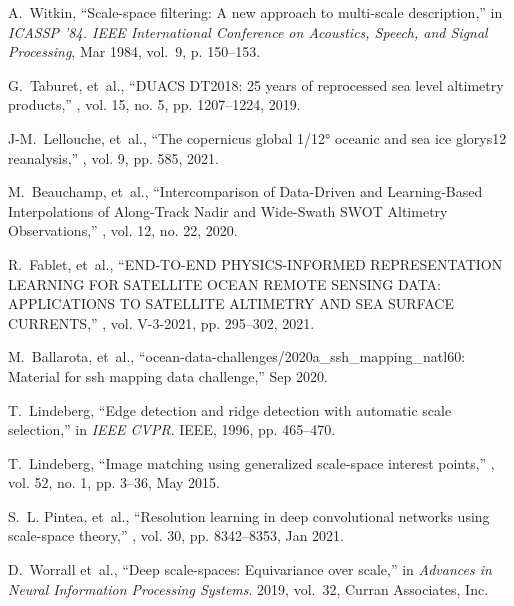 \begin{bibunit}
\begin{thebibliography}{10}
A.~Witkin,
\newblock ``Scale-space filtering: A new approach to multi-scale description,''
\newblock in {\em ICASSP ’84. IEEE International Conference on Acoustics,
  Speech, and Signal Processing}, Mar 1984, vol.~9, p. 150–153.

G.~Taburet, et~al.,
\newblock ``{DUACS} {DT2018}: 25 years of reprocessed sea level altimetry
  products,''
, vol. 15, no. 5, pp. 1207--1224, 2019.

J-M.~Lellouche, et~al.,
\newblock ``The copernicus global 1/12° oceanic and sea ice glorys12
  reanalysis,''
, vol. 9, pp. 585, 2021.

M.~Beauchamp, et~al.,
\newblock ``Intercomparison of {Data}-{Driven} and {Learning}-{Based}
  {Interpolations} of {Along}-{Track} {Nadir} and {Wide}-{Swath} {SWOT}
  {Altimetry} {Observations},''
, vol. 12, no. 22, 2020.

R.~Fablet, et~al.,
\newblock ``{END}-{TO}-{END} {PHYSICS}-{INFORMED} {REPRESENTATION} {LEARNING}
  {FOR} {SATELLITE} {OCEAN} {REMOTE} {SENSING} {DATA}: {APPLICATIONS} {TO}
  {SATELLITE} {ALTIMETRY} {AND} {SEA} {SURFACE} {CURRENTS},''
, vol. V-3-2021, pp. 295--302, 2021.

M.~Ballarota, et~al.,
\newblock ``ocean-data-challenges/2020a\_ssh\_mapping\_natl60: Material for ssh
  mapping data challenge,'' Sep 2020.

T.~Lindeberg,
\newblock ``Edge detection and ridge detection with automatic scale
  selection,''
\newblock in {\em IEEE CVPR}. IEEE, 1996, pp. 465--470.

T.~Lindeberg,
\newblock ``Image matching using generalized scale-space interest points,''
, vol. 52, no. 1, pp.
  3–36, May 2015.

S.~L. Pintea, et~al.,
\newblock ``Resolution learning in deep convolutional networks using
  scale-space theory,''
, vol. 30, pp.
  8342–8353, Jan 2021.

D.~Worrall et~al.,
\newblock ``Deep scale-spaces: Equivariance over scale,''
\newblock in {\em Advances in Neural Information Processing Systems}. 2019,
  vol.~32, Curran Associates, Inc.


\end{thebibliography}
\end{bibunit}
